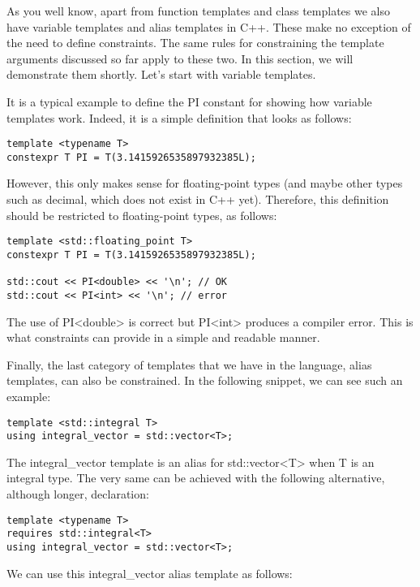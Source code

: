 As you well know, apart from function templates and class templates we also have variable templates and alias templates in C++. These make no exception of the need to define constraints. The same rules for constraining the template arguments discussed so far apply to these two. In this section, we will demonstrate them shortly. Let’s start with variable templates.

It is a typical example to define the PI constant for showing how variable templates work. Indeed, it is a simple definition that looks as follows:

\begin{lstlisting}[style=styleCXX]
template <typename T>
constexpr T PI = T(3.1415926535897932385L);
\end{lstlisting}

However, this only makes sense for floating-point types (and maybe other types such as decimal, which does not exist in C++ yet). Therefore, this definition should be restricted to floating-point types, as follows:

\begin{lstlisting}[style=styleCXX]
template <std::floating_point T>
constexpr T PI = T(3.1415926535897932385L);

std::cout << PI<double> << '\n'; // OK
std::cout << PI<int> << '\n'; // error
\end{lstlisting}

The use of PI<double> is correct but PI<int> produces a compiler error. This is what constraints can provide in a simple and readable manner.

Finally, the last category of templates that we have in the language, alias templates, can also be constrained. In the following snippet, we can see such an example:

\begin{lstlisting}[style=styleCXX]
template <std::integral T>
using integral_vector = std::vector<T>;
\end{lstlisting}

The integral\_vector template is an alias for std::vector<T> when T is an integral type. The very same can be achieved with the following alternative, although longer, declaration:

\begin{lstlisting}[style=styleCXX]
template <typename T>
requires std::integral<T>
using integral_vector = std::vector<T>;
\end{lstlisting}

We can use this integral\_vector alias template as follows:

